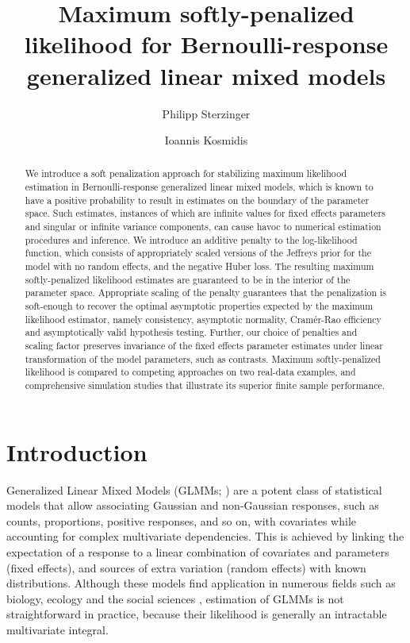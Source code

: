 \documentclass[11pt, a4paper]{article}
\title{Maximum softly-penalized likelihood for Bernoulli-response generalized linear mixed models}
\author[1]{Philipp Sterzinger}
\author[1,2]{Ioannis Kosmidis}
\affil[1]{Department of Statistics, University of Warwick, Coventry, CV4 7AL, UK}
\affil[2]{The Alan Turing Institute, London, NW1 2DB, UK}
\theoremstyle{example} \newtheorem{example}{Example}[section]
\theoremstyle{theorem} \newtheorem{theorem}{Theorem}[section]
\begin{document}
\maketitle

\begin{abstract}
  We introduce a soft penalization approach for stabilizing maximum
  likelihood estimation in Bernoulli-response generalized linear mixed
  models, which is known to have a positive probability to result in
  estimates on the boundary of the parameter space. Such estimates, instances of which
  are infinite values for fixed effects parameters and singular or
  infinite variance components, can cause havoc to numerical
  estimation procedures and inference. We introduce an additive penalty to the log-likelihood function, 
  which consists of appropriately scaled versions of the Jeffreys
  prior for the model with no random effects, and the negative Huber loss. The resulting maximum softly-penalized likelihood
  estimates are guaranteed to be in the interior of the parameter
  space. Appropriate scaling of the penalty guarantees that the penalization is soft-enough to recover
  the optimal asymptotic properties expected by the maximum likelihood
  estimator, namely consistency, asymptotic normality,
  Cram\'{e}r-Rao efficiency and asymptotically valid hypothesis testing. Further, our choice of penalties and scaling factor preserves invariance of the fixed effects parameter estimates under linear transformation of the model
  parameters, such as contrasts. Maximum softly-penalized likelihood
  is compared to competing approaches on two real-data examples,
  and comprehensive simulation studies that illustrate its superior finite sample
  performance.
  \bigskip \\
\end{abstract}

\section{Introduction}
\label{sec:intro}

Generalized Linear Mixed Models (GLMMs; \citealt[Chapter
7]{mcculloch+etal:2008}) are a potent class of statistical models
that allow associating Gaussian and non-Gaussian responses, such as
counts, proportions, positive responses, and so on, with covariates
while accounting for complex multivariate dependencies. This is achieved by linking
the expectation of a response to a linear combination of covariates
and parameters (fixed effects), and sources of extra variation (random
effects) with known distributions. Although these models find
application in numerous fields such as biology, ecology and the social
sciences \citep{bolker+etal:2009}, estimation of GLMMs is not
straightforward in practice, because their likelihood is generally an intractable
multivariate integral.
\end{document}

